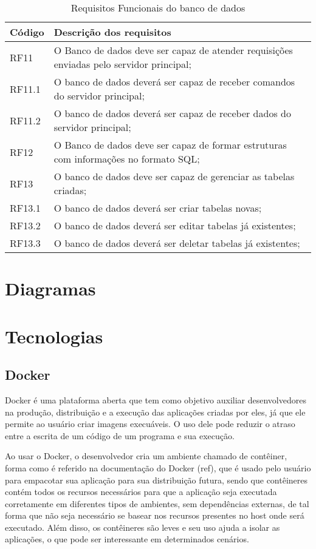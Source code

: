 \begin{table}[htp]
\renewcommand{\arraystretch}{1.3}
\caption{Requisitos Funcionais do banco de dados}
\label{descriçãoSA}
\centering
\begin{tabular}{|p{1.5cm}|p{11cm}|}
\hline
\textbf{Código}  & \textbf{Descrição dos requisitos}\\\hline
RF11 & O Banco de dados deve ser capaz de atender requisições enviadas pelo servidor principal; \\\hline
RF11.1 & O banco de dados deverá ser capaz de receber comandos do servidor principal; \\\hline
RF11.2 & O banco de dados deverá ser capaz de receber dados do servidor principal; \\\hline
RF12 & O Banco de dados deve ser capaz de formar estruturas com informações no formato SQL;  \\\hline
RF13 & O banco de dados deve ser capaz de gerenciar as tabelas criadas;\\\hline
RF13.1 & O banco de dados deverá ser criar tabelas novas;  \\\hline
RF13.2 & O banco de dados deverá ser editar tabelas já existentes;  \\\hline
RF13.3 & O banco de dados deverá ser deletar tabelas já existentes;  \\\hline
\end{tabular}
\end{table}

\section{\textbf{Diagramas}}

\section{\textbf{Tecnologias}}

\subsection{\textbf{Docker}}

Docker é uma plataforma aberta que tem como objetivo auxiliar desenvolvedores na produção, distribuição e a execução das aplicações criadas por eles, já que ele permite ao usuário criar imagens execuáveis. O uso dele pode reduzir o atraso entre a escrita de um código de um programa e sua execução.

Ao usar o Docker, o desenvolvedor cria um ambiente chamado de contêiner, forma como é referido na documentação do Docker (ref), que é usado pelo usuário para empacotar sua aplicação para sua distribuição futura, sendo que contêineres contém todos os recursos necessários para que a aplicação seja executada corretamente em diferentes tipos de ambientes, sem dependências externas, de tal forma que não seja necessário se basear nos recursos presentes no host onde será executado. Além disso, os contêineres são leves e seu uso ajuda a isolar as aplicações, o que pode ser interessante em determinados cenários.

